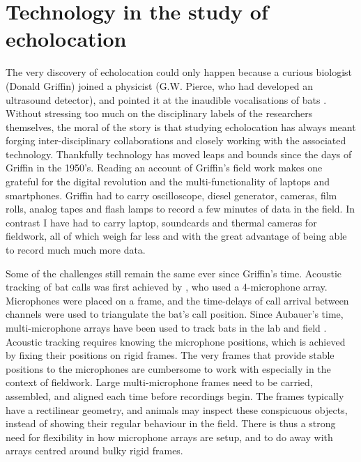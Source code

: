 \documentclass[
]{book}
\begin{document}
\hypertarget{technology-in-the-study-of-echolocation}{%
\section{Technology in the study of echolocation}\label{technology-in-the-study-of-echolocation}}

The very discovery of echolocation could only happen because a curious biologist (Donald Griffin) joined a physicist (G.W. Pierce, who had developed an ultrasound detector), and pointed it at the inaudible vocalisations of bats \citep{griffin1958a}. Without stressing too much on the disciplinary labels of the researchers themselves, the moral of the story is that studying echolocation has always meant forging inter-disciplinary collaborations and closely working with the associated technology. Thankfully technology has moved leaps and bounds since the days of Griffin in the 1950's. Reading an account of Griffin's field work \citep{griffin1958a} makes one grateful for the digital revolution and the multi-functionality of laptops and smartphones. Griffin had to carry oscilloscope, diesel generator, cameras, film rolls, analog tapes and flash lamps to record a few minutes of data in the field. In contrast I have had to carry laptop, soundcards and thermal cameras for fieldwork, all of which weigh far less and with the great advantage of being able to record much much more data.

Some of the challenges still remain the same ever since Griffin's time. Acoustic tracking of bat calls was first achieved by \citet{aubauer1994dreidimensionale}, who used a 4-microphone array. Microphones were placed on a frame, and the time-delays of call arrival between channels were used to triangulate the bat's call position. Since Aubauer's time, multi-microphone arrays have been used to track bats in the lab and field \citep{seibert2015bidirectional, ghose2006b, giuggioli2015a, fujioka2014rapid, lewanzik2020task}. Acoustic tracking requires knowing the microphone positions, which is achieved by fixing their positions on rigid frames. The very frames that provide stable positions to the microphones are cumbersome to work with especially in the context of fieldwork. Large multi-microphone frames need to be carried, assembled, and aligned each time before recordings begin. The frames typically have a rectilinear geometry, and animals may inspect these conspicuous objects, instead of showing their regular behaviour in the field. There is thus a strong need for flexibility in how microphone arrays are setup, and to do away with arrays centred around bulky rigid frames.
\end{document}
